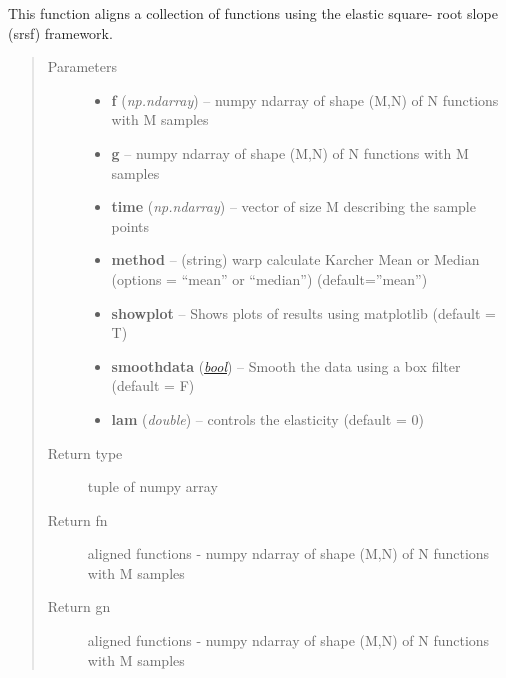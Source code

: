 \documentclass[letterpaper,10pt,english]{sphinxmanual}
\begin{document}

\begin{fulllineitems}
\label{time_warping:time_warping.srsf_align_pair}
This function aligns a collection of functions using the elastic square-
root slope (srsf) framework.
\begin{quote}\begin{description}
\item[{Parameters}] \leavevmode\begin{itemize}
\item {} 
\textbf{f} (\emph{np.ndarray}) -- numpy ndarray of shape (M,N) of N functions with M samples

\item {} 
\textbf{g} -- numpy ndarray of shape (M,N) of N functions with M samples

\item {} 
\textbf{time} (\emph{np.ndarray}) -- vector of size M describing the sample points

\item {} 
\textbf{method} -- (string) warp calculate Karcher Mean or Median (options =
``mean'' or ``median'') (default=''mean'')

\item {} 
\textbf{showplot} -- Shows plots of results using matplotlib (default = T)

\item {} 
\textbf{smoothdata} (\href{http://docs.python.org/library/functions.html\#bool}{\emph{bool}}) -- Smooth the data using a box filter (default = F)

\item {} 
\textbf{lam} (\emph{double}) -- controls the elasticity (default = 0)

\end{itemize}

\item[{Return type}] \leavevmode
tuple of numpy array

\item[{Return fn}] \leavevmode
aligned functions - numpy ndarray of shape (M,N) of N
functions with M samples

\item[{Return gn}] \leavevmode
aligned functions - numpy ndarray of shape (M,N) of N
functions with M samples


\end{description}
\end{quote}
\end{fulllineitems}
\end{document}

